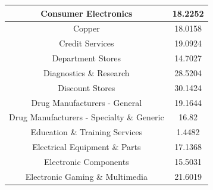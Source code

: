 \documentclass{article}
\begin{document}
\begin{xtabular}{cc}
Consumer Electronics & 18.2252\\ \hline
Copper & 18.0158\\ \hline
Credit Services & 19.0924\\ \hline
Department Stores & 14.7027\\ \hline
Diagnostics \& Research & 28.5204\\ \hline
Discount Stores & 30.1424\\ \hline
Drug Manufacturers - General & 19.1644\\ \hline
Drug Manufacturers - Specialty \& Generic & 16.82\\ \hline
Education \& Training Services & 1.4482\\ \hline
Electrical Equipment \& Parts & 17.1368\\ \hline
Electronic Components & 15.5031\\ \hline
Electronic Gaming \& Multimedia & 21.6019\\ \hline
\end{xtabular}
\end{document}
